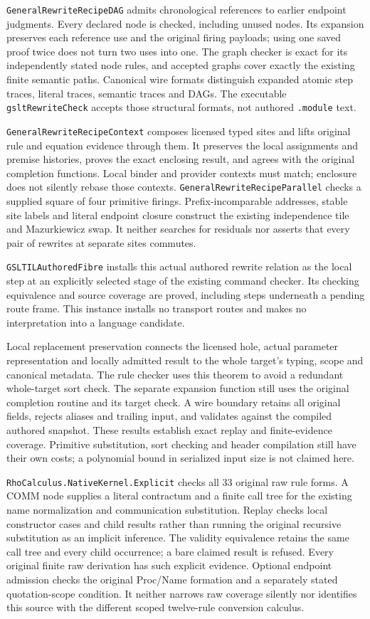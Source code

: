 \documentclass[11pt]{article}
\newcommand{\code}[1]{\nolinkurl{#1}}
\begin{document}
\code{GeneralRewriteRecipeDAG} admits chronological references to earlier
endpoint judgments. Every declared node is checked, including unused nodes.
Its expansion preserves each reference use and the original firing payloads;
using one saved proof twice does not turn two uses into one. The graph checker
is exact for its independently stated node rules, and accepted graphs cover
exactly the existing finite semantic paths. Canonical wire formats distinguish
expanded atomic step traces, literal traces, semantic traces and DAGs. The executable
\code{gsltRewriteCheck} accepts those structural formats, not authored
\code{.module} text.

\code{GeneralRewriteRecipeContext} composes licensed typed sites and lifts
original rule and equation evidence through them. It preserves the local
assignments and premise histories, proves the exact enclosing result, and
agrees with the original completion functions. Local binder and provider
contexts must match; enclosure does not silently rebase those contexts.
\code{GeneralRewriteRecipeParallel} checks a supplied square of four
primitive firings. Prefix-incomparable addresses, stable site labels and
literal endpoint closure construct the existing independence tile and
Mazurkiewicz swap. It neither searches for residuals nor asserts that every
pair of rewrites at separate sites commutes.

\code{GSLTILAuthoredFibre} installs this actual authored rewrite relation
as the local step at an explicitly selected stage of the existing command
checker. Its checking equivalence and source coverage are proved, including
steps underneath a pending route frame. This instance installs no transport
routes and makes no interpretation into a language candidate.

Local replacement preservation connects the licensed hole, actual parameter
representation and locally admitted result to the whole target's typing,
scope and canonical metadata. The rule checker uses this theorem to avoid
a redundant whole-target sort check. The separate expansion function still
uses the original completion routine and its target check. A wire boundary retains all original
fields, rejects aliases and trailing input, and validates against the compiled
authored snapshot. These results establish exact replay and finite-evidence
coverage. Primitive substitution, sort checking and header compilation still
have their own costs; a polynomial bound in serialized input size is not
claimed here.

\code{RhoCalculus.NativeKernel.Explicit} checks all 33 original raw rule
forms. A COMM node supplies a literal contractum and a finite call tree
for the existing name normalization and communication substitution.
Replay checks local constructor cases and child results rather than running
the original recursive substitution as an implicit inference.
The validity equivalence retains the same call tree and every child
occurrence; a bare claimed result is refused. Every original finite raw
derivation has such explicit evidence. Optional endpoint admission checks
the original Proc/Name formation and a separately stated quotation-scope
condition. It neither narrows raw coverage silently nor identifies this
source with the different scoped twelve-rule conversion calculus.
\end{document}
